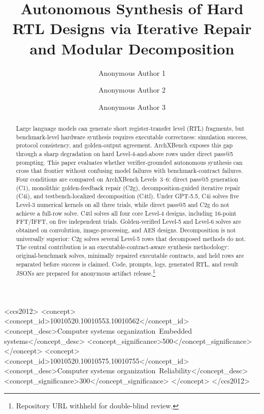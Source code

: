 \documentclass[sigconf,anonymous]{acmart}
\newcommand{\arch}{ArchXBench\xspace}
\newcommand{\cOne}{C1\xspace}
\newcommand{\cTwoG}{C2g\xspace}
\newcommand{\cFourI}{C4i\xspace}
\newcommand{\cFourTL}{C4tl\xspace}
\begin{document}
\title{Autonomous Synthesis of Hard RTL Designs via Iterative Repair and Modular Decomposition}

\author{Anonymous Author 1}

\author{Anonymous Author 2}

\author{Anonymous Author 3}

\begin{abstract}
Large language models can generate short register-transfer level (RTL) fragments, but benchmark-level hardware synthesis requires executable correctness: simulation success, protocol consistency, and golden-output agreement.
\arch exposes this gap through a sharp degradation on hard Level-4-and-above rows under direct pass@5 prompting.
This paper evaluates whether verifier-grounded autonomous synthesis can cross that frontier without confusing model failures with benchmark-contract failures.
Four conditions are compared on \arch Levels~3--6: direct pass@5 generation (\cOne), monolithic golden-feedback repair (\cTwoG), decomposition-guided iterative repair (\cFourI), and testbench-localized decomposition (\cFourTL).
Under GPT-5.5, \cFourI solves five Level-3 numerical kernels on all three trials, while direct pass@5 and \cTwoG do not achieve a full-row solve.
\cFourTL solves all four core Level-4 designs, including 16-point FFT/IFFT, on five independent trials.
Golden-verified Level-5 and Level-6 solves are obtained on convolution, image-processing, and AES designs.
Decomposition is not universally superior: \cTwoG solves several Level-5 rows that decomposed methods do not.
The central contribution is an executable-contract-aware synthesis methodology: original-benchmark solves, minimally repaired executable contracts, and held rows are separated before success is claimed.
Code, prompts, logs, generated RTL, and result JSONs are prepared for anonymous artifact release.\footnote{Repository URL withheld for double-blind review.}
\end{abstract}

\begin{CCSXML}
<ccs2012>
<concept>
<concept_id>10010520.10010553.10010562</concept_id>
<concept_desc>Computer systems organization~Embedded systems</concept_desc>
<concept_significance>500</concept_significance>
</concept>
<concept>
<concept_id>10010520.10010575.10010755</concept_id>
<concept_desc>Computer systems organization~Reliability</concept_desc>
<concept_significance>300</concept_significance>
</concept>
</ccs2012>
\end{CCSXML}
\end{document}
